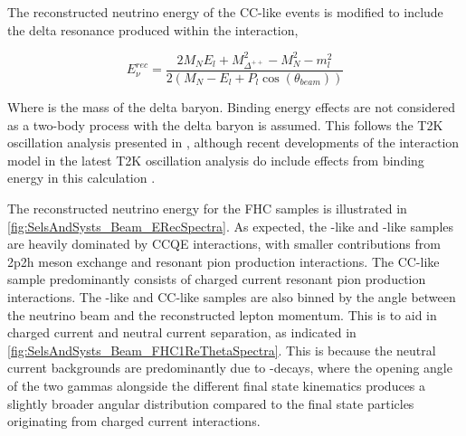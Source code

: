 The reconstructed neutrino energy of the CC\quickmath{1\pi^{+}}-like events is modified to include the delta resonance produced within the interaction,

\begin{equation}
  \label{sec:SelsAndSysts_Erec_CCRES}
  E^{rec}_{\nu} = \frac{2M_{N}E_{l} + M_{\Delta^{++}}^{2} - M_{N}^{2} - m_{l}^{2}}{2(M_{N} - E_{l} + P_{l}\cos(\theta_{beam}))}
\end{equation}

Where  is the mass of the delta baryon. Binding energy effects are not considered as a two-body process with the delta baryon is assumed. This follows the T2K oscillation analysis presented in \cite{Dunne2020-uf}, although recent developments of the interaction model in the latest T2K oscillation analysis do include effects from binding energy in this calculation \cite{t2k_tn_414}.

The reconstructed neutrino energy for the FHC samples is illustrated in \autoref{fig:SelsAndSysts_Beam_ERecSpectra}. As expected, the -like and -like samples are heavily dominated by CCQE interactions, with smaller contributions from 2p2h meson exchange and resonant pion production interactions. The CC\quickmath{1\pi^{+}}-like sample predominantly consists of charged current resonant pion production interactions. The -like and CC\quickmath{1\pi^{+}}-like samples are also binned by the angle between the neutrino beam and the reconstructed lepton momentum. This is to aid in charged current and neutral current separation, as indicated in \autoref{fig:SelsAndSysts_Beam_FHC1ReThetaSpectra}. This is because the neutral current backgrounds are predominantly due to -decays, where the opening angle of the two gammas alongside the different final state kinematics produces a slightly broader angular distribution compared to the final state particles originating from charged current  interactions.

